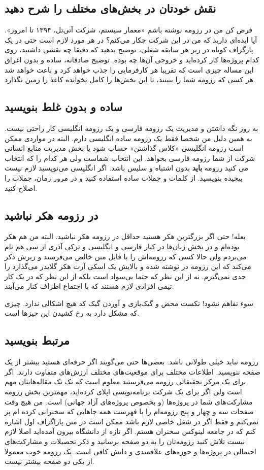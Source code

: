 \subsection*{نقش خودتان در بخش‌های مختلف را شرح دهید}
فرض کن من در رزومه نوشته باشم «معمار سیستم، شرکت آتی‌تل، ۱۳۹۴ تا امروز». آیا ایده‌ای دارید که من در این شرکت چکار می‌کنم؟ در هر مورد لازم است حتی در یک پارگراف کوتاه در زیر هر سابقه شغلی، توضیح بدهید که دقیقا چه نقشی داشتید، روی کدام پروژه‌ها کار کرده‌اید و خروجی‌ آن‌ها چه بوده. توضیح صادقانه، ساده و بدون اغراق این مساله چیزی است که تقریبا هر کارفرمایی را جذب خواهد کرد و باعث خواهد شد هر کسی که رزومه شما را ببینند، تا این بخش‌ها را کامل نخوانده کاغذ را زمین نگذارد.
\subsection*{ساده و بدون غلط بنویسید}
به روز نگه داشتن و مدیریت یک رزومه فارسی و یک رزومه انگلیسی کار راحتی نیست. به همین دلیل من شخصا فقط یک رزومه ساده انگلیسی دارم. البته در مواردی ممکن است رزومه انگلیسی «کلاس گذاشتن» حساب شود یا بخش مدیریت منابع انسانی شرکت از شما رزومه فارسی بخواهد. این انتخاب شماست ولی هر کدام را که انتخاب می کنید رزومه
\textbf{باید}
بدون اشتباه و سلیس باشد. اگر انگلیسی می‌نویسید لازم نیست پیچیده بنویسید. از کلمات و جملات ساده استفاده کنید و در مرور زمان، جملات را اصلاح کنید.
\subsection*{در رزومه هکر نباشید}
بعله! حتی اگر بزرگترین هکر هستید حداقل در رزومه هکر نباشید. البته من هم هکر بوده‌ام و در بخش زبان‌ها در کنار فارسی و انگلیسی و ترکی آذری از سی هم نام می‌بردم ولی حالا کسی که رزومه‌اش را با فایل متن خالص می‌فرستد و زیرش ذکر می‌کند که این رزومه در
نوشته شده و بالایش یک اسکی آرت هکر گلایدر می‌گذارد را جدی نمی‌گیرم. نه از این نظر که حتما بی‌سواد است بلکه از این نظر که در یک کار تیمی افرادی لازم هستند که با اجتماع اطراف کنار می‌آیند.
\begin{mybox}
سوء تفاهم نشود! تکست محض و گیک‌بازی و آوردن گیک کد هیچ اشکالی ندارد. چیزی که مشکل دارد به رخ کشیدن این چیزها است.
\end{mybox}
\subsection*{مرتبط بنویسید}
رزومه نباید خیلی طولانی باشد. بعضی‌ها حتی می‌گویند اگر حرفه‌ای هستید بیشتر از یک صفحه ننویسید. اطلاعات مختلف برای موقعیت‌های مختلف ارزش‌های متفاوت دارند. اگر برای یک مرکز تحقیقاتی رزومه می‌فرستید معلوم است که تک تک مقاله‌هایتان مهم است ولی اگر برای یک شرکت برنامه‌نویسی اپلای کرده‌اید، مهمترین بخش رزومه مشارکت‌های شما در پروژه‌ها (و بخصوص پروژه‌های‌ آزاد جهانی) است. من هیچ وقت صفحات سه و چهار و پنج رزومه‌ام را با فهرست همه جاهایی که سخنرانی کرده ام پر نمی‌کنم و فقط اگر در شغل خاصی لازم باشد ممکن است در متن پاراگراف اول اشاره کنم که در جامعه لینوکس سخنران هستم. اگر تازه از دانشگاه بیرون آمده‌اید اصلا لازم نیست تلاش کنید رزومه‌تان را به دو صفحه برسانید و ذکر تحصیلات و مشارکت‌های احتمالی در پروژه‌ها و حوزه‌های علاقمندی و دانش کافی است. یک رزومه خوب معمولا از یکی دو صفحه بیشتر نیست.

